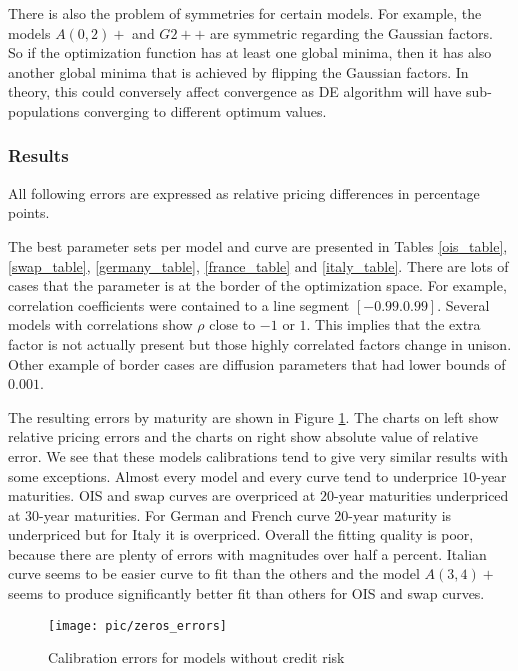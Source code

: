 There is also the problem of symmetries for certain models. For example, the models $A(0,2)+$ and $G2++$ are symmetric regarding the Gaussian factors. So if the optimization function has at least one global minima, then it has also another global minima that is achieved by flipping the Gaussian factors. In theory, this could conversely affect convergence as DE algorithm will have sub-populations converging to different optimum values.  

\subsubsection{Results}

All following errors are expressed as relative pricing differences in percentage points.

The best parameter sets per model and curve are presented in Tables \ref{ois_table}, \ref{swap_table}, \ref{germany_table}, \ref{france_table} and \ref{italy_table}. There are lots of cases that the parameter is at the border of the optimization space. For example, correlation coefficients  were contained to a line segment $[-0.99. 0.99]$. Several models with correlations show $\rho$ close to $-1$ or $1$. This implies that the extra factor is not actually present but those highly correlated factors change in unison. Other example of border cases are diffusion parameters that had lower bounds of $0.001$.

The resulting errors by maturity are shown in Figure \ref{fig:zeroserrors}. The charts on left show relative pricing errors and the charts on right show absolute value of relative error. We see that these models calibrations tend to give very similar results with some exceptions. Almost every model and every curve tend to underprice $10$-year maturities. OIS and swap curves are overpriced at $20$-year maturities underpriced at $30$-year maturities. For German and French curve $20$-year maturity is underpriced but for Italy it is overpriced. Overall the fitting quality is poor, because there are plenty of errors with magnitudes over half a percent. Italian curve seems to be easier curve to fit than the others and the model $A(3,4)+$ seems to produce significantly better fit than others for OIS and swap curves. 

\begin{figure}[H]
	\centering
	\texttt{[image: pic/zeros\_errors]}
	\caption{Calibration errors for models without credit risk}
	\label{fig:zeroserrors}
\end{figure}

